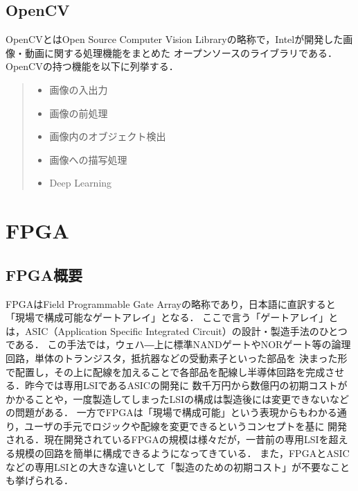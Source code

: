 \documentclass[11pt,a4j]{jreport}
\begin{document}

\subsection{OpenCV}
OpenCVとはOpen Source Computer Vision Libraryの略称で，Intelが開発した画像・動画に関する処理機能をまとめた
オープンソースのライブラリである．OpenCVの持つ機能\cite{OpenCV}を以下に列挙する．
\begin{quote}
  \begin{itemize}
    \item 画像の入出力
    \item 画像の前処理
    \item 画像内のオブジェクト検出
    \item 画像への描写処理
    \item Deep Learning
  \end{itemize}
\end{quote}

\section{FPGA}
\subsection{FPGA概要}
FPGAはField Programmable Gate Arrayの略称であり，日本語に直訳すると「現場で構成可能なゲートアレイ」となる．
ここで言う「ゲートアレイ」とは，ASIC（Application Specific Integrated Circuit）の設計・製造手法のひとつである．
この手法では，ウェハ―上に標準NANDゲートやNORゲート等の論理回路，単体のトランジスタ，抵抗器などの受動素子といった部品を
決まった形で配置し，その上に配線を加えることで各部品を配線し半導体回路を完成させる．昨今では専用LSIであるASICの開発に
数千万円から数億円の初期コストがかかることや，一度製造してしまったLSIの構成は製造後には変更できないなどの問題がある．
一方でFPGAは「現場で構成可能」という表現からもわかる通り，ユーザの手元でロジックや配線を変更できるというコンセプトを基に
開発される．現在開発されているFPGAの規模は様々だが，一昔前の専用LSIを超える規模の回路を簡単に構成できるようになってきている．
また，FPGAとASICなどの専用LSIとの大きな違いとして「製造のための初期コスト」が不要なことも挙げられる．
\end{document}
